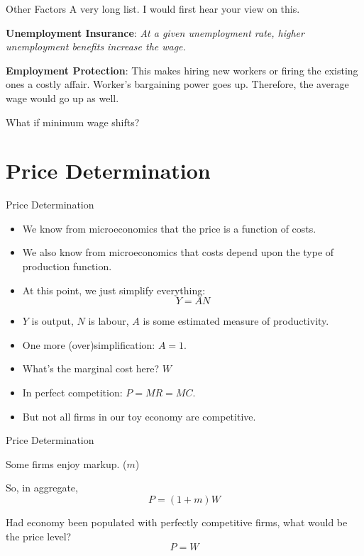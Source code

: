 \documentclass[shownotes,11pt, aspectratio=169]{beamer}
\newenvironment{wideitemize}{\itemize\addtolength{\itemsep}{10pt}}{\enditemize}
\begin{document}
\begin{frame}{Other Factors}
A very long list. I would first hear your view on this.
\pause
\begin{wideitemize}
\item \textbf{Unemployment Insurance}: \textit{At a given unemployment rate, higher unemployment benefits
increase the wage.}
\item \textbf{Employment Protection}: This makes hiring new workers or firing the existing ones a costly affair. Worker's bargaining power goes up. Therefore, the average wage would go up as well.
\item What if minimum wage shifts?
\end{wideitemize}
\end{frame}

\section{Price Determination}
\begin{frame}{Price Determination}
\begin{itemize}
\item We know from microeconomics that the price is a function of costs. 
\item We also know from microeconomics that costs depend upon the type of production function.
\item At this point, we just simplify everything:
     \[ Y = AN \]
\item $Y$ is output, $N$ is labour, $A$ is some estimated measure of productivity.
\item One more (over)simplification: $A = 1$.
\item What's the marginal cost here? \pause $W$
\item In perfect competition: $P = MR = MC$.
\item But not all firms in our toy economy are competitive. 
\end{itemize}
\end{frame}

\begin{frame}{Price Determination}
\begin{wideitemize}
\item Some firms enjoy markup. ($m$)
\item So, in aggregate, 
     \[ P = (1 + m)W \]
\item Had economy been populated with perfectly competitive firms, what would be the price level? \pause
     \[ P = W \]
\end{wideitemize}
\end{frame}
\end{document}
